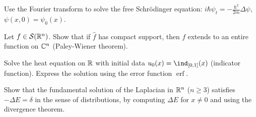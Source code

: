 \begin{exercise}
Use the Fourier transform to solve the free Schr\"odinger equation:
$i\hbar \psi_t = -\frac{\hbar^2}{2m}\Delta \psi$, $\psi(x,0) = \psi_0(x)$.
\end{exercise}

\begin{exercise}
Let $f \in \mathcal{S}(\mathbb{R}^n)$. Show that if $\hat{f}$ has compact support, then
$f$ extends to an entire function on $\mathbb{C}^n$ (Paley-Wiener theorem).
\end{exercise}

\begin{exercise}
Solve the heat equation on $\mathbb{R}$ with initial data $u_0(x) = \ind_{[0,1]}(x)$
(indicator function). Express the solution using the error function $\operatorname{erf}$.
\end{exercise}

\begin{exercise}
Show that the fundamental solution of the Laplacian in $\mathbb{R}^n$ ($n \geq 3$)
satisfies $-\Delta E = \delta$ in the sense of distributions, by computing
$\Delta E$ for $x \neq 0$ and using the divergence theorem.
\end{exercise}
